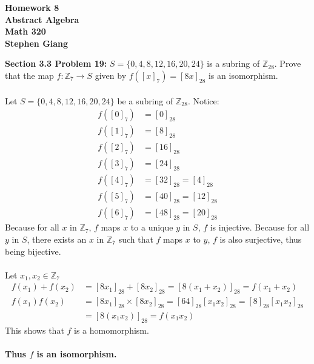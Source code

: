 \documentclass[12pt]{article}
\begin{document}
	\begin{center}
		\textbf{Homework 8} \\
		\textbf{Abstract Algebra} \\
		\textbf{Math 320} \\
		\textbf{Stephen Giang} \\
	\end{center}

\noindent \textbf{Section 3.3 Problem 19: }$S = \{0, 4, 8, 12, 16, 20, 24\}$ is a subring of $\mathbb{Z}_{28}$. Prove that the map $f: \mathbb{Z}_7 \rightarrow S$ given by $f([x]_7) = [8x]_{28}$ is an isomorphism.
\\ \\
	Let $S = \{0, 4, 8, 12, 16, 20, 24\}$ be a subring of $\mathbb{Z}_{28}$. Notice:
	\begin{align*}
		f([0]_7) &= [0]_{28} \\ 
		f([1]_7) &= [8]_{28} \\ 
		f([2]_7) &= [16]_{28} \\ 
		f([3]_7) &= [24]_{28} \\ 
		f([4]_7) &= [32]_{28} = [4]_{28} \\ 
		f([5]_7) &= [40]_{28} = [12]_{28} \\ 
		f([6]_7) &= [48]_{28} = [20]_{28}
	\end{align*}
	Because for all $x$ in $\mathbb{Z}_7$, $f$ maps $x$ to a unique $y$ in $S$, $f$ is injective. Because for all $y$ in $S$, there exists an $x$ in $\mathbb{Z}_7$ such that $f$ maps $x$ to $y$, $f$ is also surjective, thus being bijective. 
	\\ \\
	Let $x_1,x_2 \in \mathbb{Z}_7$
	\begin{align*}
		f(x_1) + f(x_2) &= [8x_1]_{28} + [8x_2]_{28} = [8(x_1 + x_2)]_{28} = f(x_1 + x_2) \\
		f(x_1) f(x_2) &= [8x_1]_{28} \times [8x_2]_{28} = [64]_{28}[x_1 x_2]_{28} = [8]_{28}[x_1 x_2]_{28} \\
		&= [8(x_1 x_2)]_{28} = f(x_1 x_2)
	\end{align*}
	This shows that $f$ is a homomorphism. 
	\\ \\
	\textbf{\boldmath Thus $f$ is an isomorphism.}

\newpage 
\end{document}
